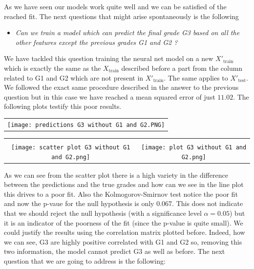 \documentclass[a4paper, 11pt]{report}
\theoremstyle{definition}
\numberwithin{equation}{section}		%
\numberwithin{figure}{section}			%
\numberwithin{table}{section}				%
\begin{document}
As we have seen our models work quite well and we can be satisfied of the reached fit. The next questions that might arise spontaneously is the following
\begin{itemize}
    \item \textit{Can we train a model which can predict the final grade G3 based on all the other features except the previous grades G1 and G2 ?}
\end{itemize}
We have tackled this question training the neural net model on a new $X'_{\text{train}}$ which is exactly the same as the $X_{\text{train}}$ described before a part from the column related to G1 and G2 which are not present in $X'_{\text{train}}$. The same applies to $X'_{\text{test}}$. We followed the exact same procedure described in the answer to the previous question but in this case we have reached a mean squared error of just $11.02$. The following plots testify this poor results.
\newline
    \begin{frame}
      \centering
        \begin{tabular}{c}
         \\
        \texttt{[image: predictions G3 without G1 and G2.PNG]}
      \end{tabular}

      \vspace{0.05em}
        \begin{tabular}{cc}
          &  \\
        \texttt{[image: scatter plot G3 without G1 and G2.png]}
         &
         \texttt{[image: plot G3 without G1 and G2.png]}
         \end{tabular}
    \end{frame}
\newline
As we can see from the scatter plot there is a high variety in the difference between the predictions and the true grades and how can we see in the line plot this drives to a poor fit. Also the Kolmogorov-Smirnov test notice the poor fit and now the p-vaue for the null hypothesis is only $0.067$. This does not indicate that we should reject the null hypothesis (with a significance level $\alpha = 0.05$) but it is an indicator of the poorness of the fit (since the p-value is quite small).
We could justify the results using the correlation matrix plotted before. Indeed, how we can see, G3 are highly positive correlated with G1 and G2 so, removing this two information, the model cannot predict G3 as well as before.
The next question that we are going to address is the following:
\end{document}

